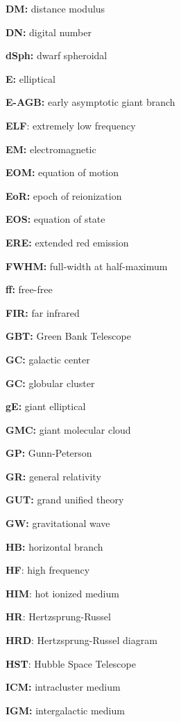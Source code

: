\documentclass[a4paper,10pt]{article}
\begin{document}
{\noindent}\textbf{DM:} distance modulus

{\noindent}\textbf{DN:} digital number

{\noindent}\textbf{dSph:} dwarf spheroidal

{\noindent}\textbf{E:} elliptical

{\noindent}\textbf{E-AGB:} early asymptotic giant branch

{\noindent}\textbf{ELF}: extremely low frequency

{\noindent}\textbf{EM:} electromagnetic

{\noindent}\textbf{EOM:} equation of motion

{\noindent}\textbf{EoR:} epoch of reionization

{\noindent}\textbf{EOS:} equation of state

{\noindent}\textbf{ERE:} extended red emission

{\noindent}\textbf{FWHM:} full-width at half-maximum

{\noindent}\textbf{ff:} free-free

{\noindent}\textbf{FIR:} far infrared

{\noindent}\textbf{GBT:} Green Bank Telescope

{\noindent}\textbf{GC:} galactic center

{\noindent}\textbf{GC:} globular cluster

{\noindent}\textbf{gE:} giant elliptical

{\noindent}\textbf{GMC:} giant molecular cloud

{\noindent}\textbf{GP:} Gunn-Peterson

{\noindent}\textbf{GR:} general relativity

{\noindent}\textbf{GUT:} grand unified theory

{\noindent}\textbf{GW:} gravitational wave

{\noindent}\textbf{HB:} horizontal branch

{\noindent}\textbf{HF}: high frequency

{\noindent}\textbf{HIM}: hot ionized medium

{\noindent}\textbf{HR}: Hertzsprung-Russel

{\noindent}\textbf{HRD}: Hertzsprung-Russel diagram

{\noindent}\textbf{HST}: Hubble Space Telescope

{\noindent}\textbf{ICM:} intracluster medium

{\noindent}\textbf{IGM:} intergalactic medium
\end{document}
